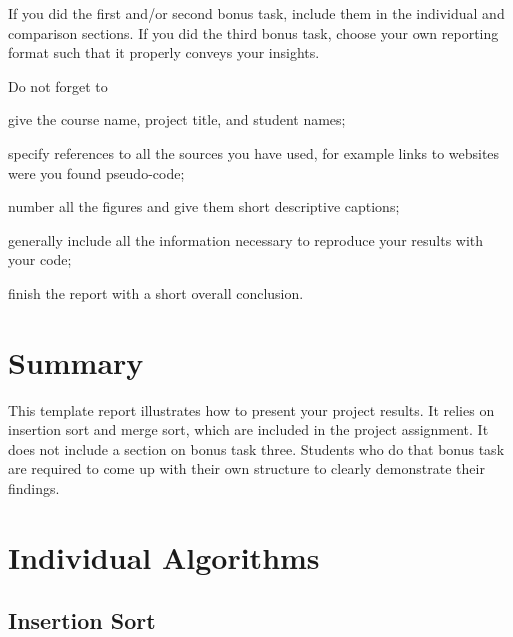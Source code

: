 \documentclass[a4paper,10pt]{article}
\begin{document}
If you did the first and/or second bonus task, include them in the individual and comparison sections.
If you did the third bonus task, choose your own reporting format such that it properly conveys your insights.

Do not forget to
\begin{compactitem}
\item
  give the course name, project title, and student names;
\item
  specify references to all the sources you have used, for example links to websites were you found pseudo-code;
\item
  number all the figures and give them short descriptive captions;
\item
  generally include all the information necessary to reproduce your results with your code;
\item
  finish the report with a short overall conclusion.
\end{compactitem}



\section*{Summary}

This template report illustrates how to present your project results.
It relies on insertion sort and merge sort, which are included in the project assignment.
It does not include a section on bonus task three.
Students who do that bonus task are required to come up with their own structure to clearly demonstrate their findings.



\section*{Individual Algorithms}



\subsection*{Insertion Sort}
\end{document}
